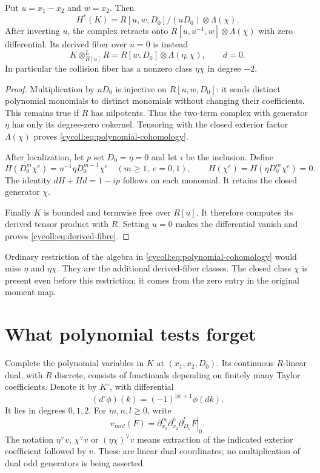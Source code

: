 \begin{proposition}\label{cycoll:prop:polynomial-fibre}
Put $u=x_1-x_2$ and $w=x_2$. Then
\begin{equation}\label{cycoll:eq:polynomial-cohomology}
 H^*(K)=R[u,w,D_0]/(uD_0)\otimes\Lambda(\chi).
\end{equation}
After inverting $u$, the complex retracts onto
$R[u,u^{-1},w]\otimes\Lambda(\chi)$ with zero differential.
Its derived fiber over $u=0$ is instead
\begin{equation}\label{cycoll:eq:derived-fibre}
 K\otimes^L_{R[u]}R
   =R[w,D_0]\otimes\Lambda(\eta,\chi),\qquad d=0.
\end{equation}
In particular the collision fiber has a nonzero class $\eta\chi$
in degree $-2$.
\end{proposition}
\begin{proof}
Multiplication by $uD_0$ is injective on $R[u,w,D_0]$: it sends
distinct polynomial monomials to distinct monomials without
changing their coefficients. This remains true if $R$ has
nilpotents. Thus the two-term complex with generator $\eta$ has
only its degree-zero cokernel. Tensoring with the closed exterior
factor $\Lambda(\chi)$ proves
\eqref{cycoll:eq:polynomial-cohomology}.

After localization, let $p$ set $D_0=\eta=0$ and let $i$ be the
inclusion. Define
\[
 H(D_0^m\chi^e)=u^{-1}\eta D_0^{m-1}\chi^e
 \quad(m\geq1,\ e=0,1),\qquad
 H(\chi^e)=H(\eta D_0^m\chi^e)=0.
\]
The identity $dH+Hd=1-ip$ follows on each monomial. It retains
the closed generator $\chi$.

Finally $K$ is bounded and termwise free over $R[u]$. It therefore
computes its derived tensor product with $R$. Setting $u=0$ makes
the differential vanish and proves
\eqref{cycoll:eq:derived-fibre}.
\end{proof}

Ordinary restriction of the algebra in
\eqref{cycoll:eq:polynomial-cohomology} would miss $\eta$ and
$\eta\chi$. They are the additional derived-fiber classes. The
closed class $\chi$ is present even before this restriction; it
comes from the zero entry in the original moment map.

\section{What polynomial tests forget}
\label{cycoll:sec:projection}

Complete the polynomial variables in $K$ at $(x_1,x_2,D_0)$.
Its continuous $R$-linear dual, with $R$ discrete, consists of
functionals depending on finitely many Taylor coefficients. Denote
it by $K^\circ$, with differential
\[
 (d^\circ\phi)(k)=(-1)^{|\phi|+1}\phi(dk).
\]
It lies in degrees $0,1,2$. For $m,n,l\geq0$, write
\[
 v_{mnl}(F)=
 \left.\partial_{x_1}^m\partial_{x_2}^n\partial_{D_0}^lF\right|_0.
\]
The notation $\eta^\vee v$, $\chi^\vee v$ or
$(\eta\chi)^\vee v$ means extraction of the indicated exterior
coefficient followed by $v$. These are linear dual coordinates;
no multiplication of dual odd generators is being asserted.

